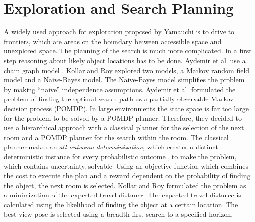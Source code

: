 \section{Exploration and Search Planning}

A widely used approach for exploration proposed by Yamauchi \cite{frontier} is to drive to frontiers, which are areas on the boundary between accessible space and unexplored space. The planning of the search is much more complicated. In a first step reasoning about likely object locations has to be done. Aydemir et al. \cite{main} use a chain graph model \cite{chaingraph}. Kollar and Roy \cite{objobj} explored two models, a Markov random field model and a Naive-Bayes model. The Naive-Bayes model simplifies the problem by making ``naive'' independence assumptions. Aydemir et al. \cite{main} formulated the problem of finding the optimal search path as a partially observable Markov decision process (POMDP). In large environments the state space is far too large for the problem to be solved by a POMDP-planner. Therefore, they decided to use a hierarchical approach with a classical planner for the selection of the next room and a POMDP planner for the search within the room. The classical planner makes an \textit{all outcome determinization}, which creates a distinct deterministic instance for every probabilistic outcome \cite{allOutcome}, to make the problem, which contains uncertainty, solvable. Using an objective function which combines the cost to execute the plan and a reward dependent on the probability of finding the object, the next room is selected. Kollar and Roy \cite{objobj} formulated the problem as a minimization of the expected travel distance. The expected travel distance is calculated using the likelihood of finding the object at a certain location. The best view pose is selected using a breadth-first search to a specified horizon.